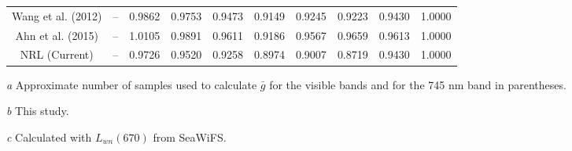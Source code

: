 \documentclass[preview]{standalone}
\begin{document}
\begin{threeparttable}
\begin{tabular}{cccccccccc}
Wang et al. (2012)& 	--				& 0.9862 			& 0.9753 			& 0.9473 			& 0.9149 			& 0.9245 & 0.9223 & 0.9430 & 1.0000 \\
Ahn et al. (2015)& 	-- & 1.0105 & 0.9891 & 0.9611 & 0.9186 & 0.9567 & 0.9659 & 0.9613 & 1.0000 \\
NRL (Current) 	& --	& 0.9726 & 0.9520 & 0.9258 & 0.8974 & 0.9007 & 0.8719 & 0.9430 & 1.0000 \\

\hline 
\end{tabular}
\begin{tablenotes}
\small
\item [\it a] Approximate number of samples used to calculate $\bar{g}$ for the visible bands and for the 745 nm band in parentheses.
\item [\it b] This study.
\item [\it c] Calculated with $L_{wn}(670)$ from SeaWiFS.
\end{tablenotes}
\end{threeparttable}
\end{document}
